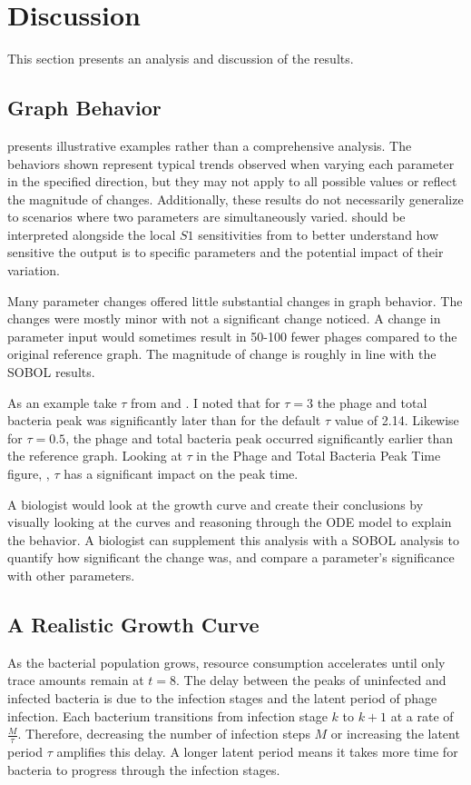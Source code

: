 \chapter{Discussion}
\label{Discussion}
This section presents an analysis and discussion of the results. 

\section{Graph Behavior}
 presents illustrative examples rather than a comprehensive analysis. 
The behaviors shown represent typical trends observed when varying each parameter in the specified direction, but they may not apply to all possible values or reflect the magnitude of changes. 
Additionally, these results do not necessarily generalize to scenarios where two parameters are simultaneously varied. 
 should be interpreted alongside the local $S1$ sensitivities from  to better understand how sensitive the output is to specific parameters and the potential impact of their variation.

Many parameter changes offered little substantial changes in graph behavior. 
The changes were mostly minor with not a significant change noticed. 
A change in parameter input would sometimes result in 50-100 fewer phages compared to the original reference graph. 
The magnitude of change is roughly in line with the SOBOL results. 

As an example take $\tau$ from  and . 
I noted that for $\tau=3$ the phage and total bacteria peak was significantly later than for the default $\tau$ value of 2.14. 
Likewise for $\tau=0.5$, the phage and total bacteria peak occurred significantly earlier than the reference graph. 
Looking at $\tau$ in the Phage and Total Bacteria Peak Time figure, , $\tau$ has a significant impact on the peak time. 

A biologist would look at the growth curve and create their conclusions by visually looking at the curves and reasoning through the ODE model to explain the behavior. 
A biologist can supplement this analysis with a SOBOL analysis to quantify how significant the change was, and compare a parameter's significance with other parameters. 

\section{A Realistic Growth Curve}
As the bacterial population grows, resource consumption accelerates until only trace amounts remain at $t=8$. 
The delay between the peaks of uninfected and infected bacteria is due to the infection stages and the latent period of phage infection. 
Each bacterium transitions from infection stage $k$ to $k+1$ at a rate of $\frac{M}{\tau}$. 
Therefore, decreasing the number of infection steps $M$ or increasing the latent period $\tau$ amplifies this delay. 
A longer latent period means it takes more time for bacteria to progress through the infection stages.

